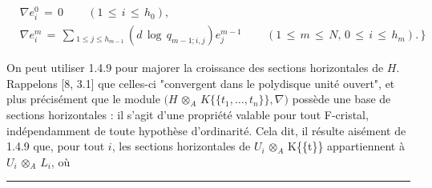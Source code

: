 \documentclass[9pt]{article}
\newcommand{\CanonText}[1]{\par{\fontsize{8.0}{9.35}\selectfont\RaggedRight #1\par}\vspace{2.2pt}}
\newenvironment{CanonMathBlock}{\par\vspace{1.2pt}\begin{center}\fontsize{6.8}{8.0}\selectfont\(\displaystyle}{\)\end{center}\vspace{1.2pt}}
\begin{document}
\begin{minipage}[t][\dimexpr\textheight-5pt\relax][t]{\textwidth}
\begin{CanonMathBlock}
\begin{aligned}
& \nabla{}e_{i}^{0}\,=\,0\qquad\,(1\,\leq{}\,i\,\leq{}\,h_{0}),\\
& \nabla{}e_{i}^{m}\,=\,\sum{}_{1\leq{}j\leq{}h_{m-1}}\,(d\,\operatorname{log}\,q_{m-1;i,j})e_{j}^{m-1}\qquad\,(1\,\leq{}\,m\,\leq{}\,N,\,0\,\leq{}\,i\,\leq{}\,h_{m}).\,\rbrace{}
\end{aligned}
\end{CanonMathBlock}
\CanonText{On peut utiliser 1.4.9 pour majorer la croissance des sections horizontales de \(H\). Rappelons [8, 3.1] que celles-ci "convergent dans le polydisque unité ouvert", et plus précisément que le module \((H\) \(\otimes{}_{A}\) \(K\lbrace{}\lbrace{}t_{1},\ldots{},t_{n}\rbrace{}\rbrace{},\nabla{})\) possède une base de sections horizontales : il s'agit d'une propriété valable pour tout F-cristal, indépendamment de toute hypothèse d'ordinarité. Cela dit, il résulte aisément de 1.4.9 que, pour tout \(i\), les sections horizontales de \(U_{i}\) \(\otimes{}_{A}\) K\{\{t\}\} appartiennent à \(U_{i}\) \(\otimes{}_{A}\) \(L_{i}\), où}
\vfill
{\color{Accent}\hrule height 0.35pt}\vspace{3pt}
\end{minipage}
\newpage
\end{document}

